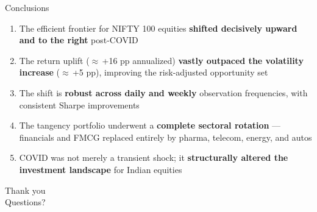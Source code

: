 \documentclass[aspectratio=169]{beamer}
\begin{document}
\begin{frame}{Conclusions}
  \begin{enumerate}
    \item The efficient frontier for NIFTY 100 equities \textbf{shifted decisively upward and to the right} post-COVID
    \vspace{0.4em}
    \item The return uplift ($\approx$\,+16 pp annualized) \textbf{vastly outpaced the volatility increase} ($\approx$\,+5 pp), improving the risk-adjusted opportunity set
    \vspace{0.4em}
    \item The shift is \textbf{robust across daily and weekly} observation frequencies, with consistent Sharpe improvements
    \vspace{0.4em}
    \item The tangency portfolio underwent a \textbf{complete sectoral rotation} --- financials and FMCG replaced entirely by pharma, telecom, energy, and autos
    \vspace{0.4em}
    \item COVID was not merely a transient shock; it \textbf{structurally altered the investment landscape} for Indian equities
  \end{enumerate}
\end{frame}

\begin{frame}[standout]
  Thank you\\[0.5em]
  \normalsize Questions?
\end{frame}
\end{document}

